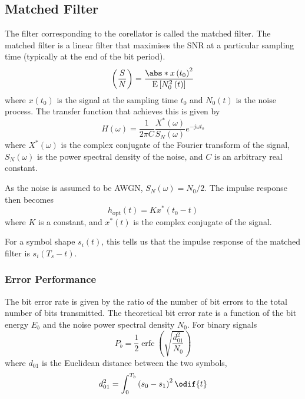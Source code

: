 \documentclass{article}
\DeclareMathOperator{\erfc}{erfc}
\begin{document}
\subsection{Matched Filter}
The filter corresponding to the corellator is called the matched filter.
The matched filter is a linear filter that maximises the SNR at a
particular sampling time (typically at the end of the bit period).
\begin{equation*}
    \left( \frac{S}{N} \right) = \frac{\abs*{x\left( t_0 \right)}^2}{\mathrm{E}\left[ N_0^2\left( t \right) \right]}
\end{equation*}
where \(x\left( t_0 \right)\) is the signal at the sampling time \(t_0\)
and \(N_0\left( t \right)\) is the noise process. The transfer function
that achieves this is given by
\begin{equation*}
    H\left( \omega \right) = \frac{1}{2 \pi C} \frac{X^\ast\left( \omega \right)}{S_N\left( \omega \right)} e^{-j\omega t_o}
\end{equation*}
where \(X^\ast\left( \omega \right)\) is the complex conjugate of the
Fourier transform of the signal, \(S_N\left( \omega \right)\) is the
power spectral density of the noise, and \(C\) is an arbitrary real
constant.

As the noise is assumed to be AWGN, \(S_N\left( \omega \right) = N_0/2\).
The impulse response then becomes
\begin{equation*}
    h_{\mathrm{opt}}\left( t \right) = K x^\ast\left( t_0 - t \right)
\end{equation*}
where \(K\) is a constant, and \(x^\ast\left( t \right)\) is the
complex conjugate of the signal.

For a symbol shape \(s_i\left( t \right)\), this tells us that the
impulse response of the matched filter is \(s_i\left( T_s - t \right)\).
\subsubsection{Error Performance}
The bit error rate is given by the ratio of the number of bit errors to
the total number of bits transmitted. The theoretical bit error rate is
a function of the bit energy \(E_b\) and the noise power spectral
density \(N_0\). For binary signals
\begin{equation*}
    P_b = \frac{1}{2} \erfc{\left( \sqrt{\frac{d_{\mathrm{01}}^2}{N_0}} \right)}
\end{equation*}
where \(d_{\mathrm{01}}\) is the Euclidean distance between the two
symbols,
\begin{equation*}
    d_{\mathrm{01}}^2 = \int_0^{T_b} \left( s_0 - s_1 \right)^2 \odif{t}
\end{equation*}
\end{document}
